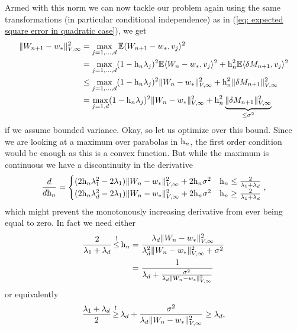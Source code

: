 Armed with this norm we can now tackle our problem again using the same
transformations (in particular conditional independence) as in (\ref{eq:
expected square error in quadratic case}), we get
\begin{align}
	\nonumber
	\|W_{n+1} -w_*\|_{V,\infty}^2
	&= \max_{j=1,\dots,d} \mathbb{E}\langle W_{n+1} -w_*, v_j\rangle^2\\
	\nonumber
	&= \max_{j=1,\dots,d} (1-\text{h}_n\lambda_j)^2\mathbb{E}\langle W_n -w_*, v_j\rangle^2
	+ \text{h}_n^2 \mathbb{E}\langle \delta M_{n+1}, v_j \rangle^2\\
	\nonumber
	&\le \max_{j=1,\dots,d} (1-\text{h}_n\lambda_j)^2\|W_n -w_*\|_{V,\infty}^2
	+ \text{h}_n^2 \|\delta M_{n+1}\|_{V,\infty}^2\\
	\label{eq: upper bound weird norm weight distance}
	&= \max_{j=1,d} (1-\text{h}_n\lambda_j)^2\|W_n -w_*\|_{V,\infty}^2
	+ \text{h}_n^2 \underbrace{\|\delta M_{n+1}\|_{V,\infty}^2}_{\le \sigma^2}
\end{align}
if we assume bounded variance. Okay, so let us optimize over this bound. Since
we are looking at a maximum over parabolas in \(\text{h}_n\), the first order
condition would be enough as this is a convex function. But while the maximum is
continuous we have a discontinuity in the derivative 
\begin{align*}
	\frac{d}{d\text{h}_n}
	= \begin{cases}
	(2\text{h}_n \lambda_1^2 - 2\lambda_1)\|W_n-w_*\|_{V,\infty}^2
	+ 2 \text{h}_n \sigma^2
	& \text{h}_n \le \frac{2}{\lambda_1+\lambda_d}\\
	(2\text{h}_n \lambda_d^2 - 2\lambda_1)\|W_n-w_*\|_{V,\infty}^2
	+ 2 \text{h}_n \sigma^2
	& \text{h}_n \ge \frac{2}{\lambda_1+\lambda_d}
	\end{cases},
\end{align*}
which might prevent the monotonously increasing derivative from ever being equal
to zero. In fact we need either
\begin{align*}
	\frac{2}{\hesseEV_1+\hesseEV_\dimension} \xle{!} \lr_n
	&= \frac{
		\hesseEV_\dimension \|\Weights_n-\minimum\|_{V,\infty}^2
	}{
		\hesseEV_\dimension^2 \|\Weights_n-\minimum\|_{V,\infty}^2 + \stdBound^2
	}\\
	&= \frac{1}{
		\hesseEV_\dimension
		+ \frac{\stdBound^2}{
			\hesseEV_\dimension\|\Weights_n-\minimum\|_{V,\infty}^2
		}
	}
\end{align*}
or equivalently
\begin{align*}
	\frac{\hesseEV_1+\hesseEV_\dimension}{2}
	\xge{!} \hesseEV_\dimension
	+ \frac{\stdBound^2}{
		\hesseEV_\dimension\|\Weights_n-\minimum\|_{V,\infty}^2
	}
	\ge \hesseEV_\dimension,
\end{align*}
